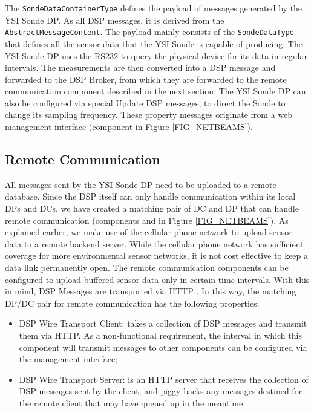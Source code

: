 \documentclass[conference]{IEEEtran}
\begin{document}
The \texttt{SondeDataContainerType} defines the payload of messages generated
by the YSI Sonde DP. As all DSP messages, it is derived from the
\texttt{AbstractMessageContent}. The payload mainly consists of the
\texttt{SondeDataType} that defines all the sensor data that the YSI Sonde is
capable of producing. The YSI Sonde DP uses the RS232 to query the
physical device for its data in regular intervals. The measurements
are then converted into a DSP message and forwarded to the DSP Broker,
from which they are forwarded to the remote communication component
described in the next section.  The YSI Sonde DP can also be
configured via special Update DSP messages, to direct the Sonde to change its
sampling frequency.  These property messages originate from a web
management interface (component  in Figure \ref{FIG_NETBEAMS}).


\subsection{Remote Communication}

All messages sent by the YSI Sonde DP need to be uploaded to a remote
database. Since the DSP itself can only handle communication within
its local DPs and DCs, we have created a matching pair of DC and DP
that can handle remote communication (components  and  in Figure
\ref{FIG_NETBEAMS}). As explained earlier, we make use of the cellular
phone network to upload sensor data to a remote backend server. While
the cellular phone network has sufficient coverage for more
environmental sensor networks, it is not cost effective to keep a data
link permanently open. The remote communication components can be
configured to upload buffered sensor data only in certain time
intervals. With this in mind, DSP Messages are transported via HTTP
\cite{RFC2068}. In this way, the matching DP/DC pair for remote communication
has the following properties:

\begin{itemize}
\item DSP Wire Transport Client: takes a collection of DSP messages
  and transmit them via HTTP. As a non-functional requirement, the
  interval in which this component will transmit messages to other
  components can be configured via the management interface;
\item DSP Wire Transport Server: is an HTTP server that receives the
  collection of DSP messages sent by the client, and piggy backs any
  messages destined for the remote client that may have queued up in
  the meantime.
\end{itemize}
\end{document}
